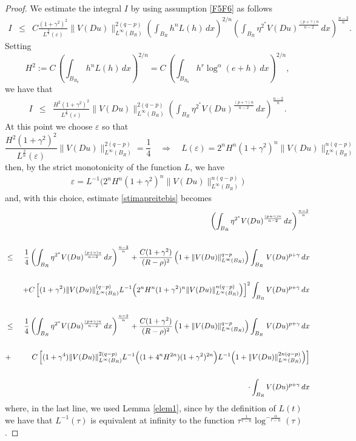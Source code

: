 \documentclass[12pt]{amsart}
\theoremstyle{definition}
\numberwithin{equation}{section}
\numberwithin{equation}{section}
\begin{document}
{\begin{proof}
We estimate the integral $I$ by using assumption \eqref{F5F6} as follows
\begin{eqnarray*}
I &\le& C\frac{(1+\gamma^2)^2}{{L^{\frac{2}{n}}(\varepsilon)}} \|V(Du)\|_{L^\infty\left(B_{{R}}\right)}^{2(q-p)} \left (\int_{B_{{R}}}h^n L(h) \, dx \right )^{2/n} \left (\int_{B_{{R}}}\eta^{2^*}V(Du)^{\frac{(p + \gamma) n}{n-2}} \, dx \right )^{\frac{n-2}{n}}.
\end{eqnarray*}
Setting
\[
H^2 := C \, \left (\int_{B_{R_0}}  h^n L(h) \, dx \right )^{2/n} = C \, \left (\int_{B_{R_0}}  h^r\log^\alpha(e+h) \, dx \right )^{2/n},
\]
 we have that
\begin{eqnarray*}
I &\le& \frac{H^2(1+\gamma^2)^2}{{L^{\frac{2}{n}}(\varepsilon)}} \|V(Du)\|_{L^\infty\left(B_{{R}}\right)} ^{2(q-p)}\left (\int_{B_{R}}\eta^{2^*} V(Du)^{ \frac{(p + \gamma) n}{n-2}} \, dx \right )^{\frac{n-2}{n}}.
\end{eqnarray*}
 At this point we choose $\varepsilon$ so that
\[
\frac{H^2(1+\gamma^2)^2}{{L^{\frac{2}{n}}(\varepsilon)}} \|V(Du)\|_{L^\infty\left(B_{{R}}\right)}^{2(q-p)} = \frac{1}{4}\quad\Longrightarrow  \quad L(\varepsilon)=2^{n}H^n(1+\gamma^2)^n\|V(Du)\|_{L^\infty\left(B_{{R}}\right)}^{n(q-p)}
\]
then, by the strict monotonicity of the function $L$,
 we have 
\begin{eqnarray*}
 \varepsilon = {{L}}^{-1} \Big(2^{n} H^n (1+\gamma^2)^n \|V(Du)\|^{n(q-p)}_{L^\infty\left(B_{{R}}\right)}\Big) 
\end{eqnarray*}
and, with this choice, estimate \eqref{stimapreitebis} becomes
\begin{eqnarray*}
&&\left (\int_{B_{{R}}} \eta^{2^*}V(Du)^{\frac{(p + \gamma) n}{n-2}} \,dx \right )^{\frac{n-2}{n}}\cr\cr
&\le& \frac{1}{4} \left (\int_{B_{{R}}}\eta^{2^*} V(Du)^{\frac{(p + \gamma)n}{n-2}} \, dx \right )^{\frac{n-2}{n}} +\frac{C(1+\gamma^2)}{({R - \rho})^{2}}  \left(1 + \|V(Du)\|_{L^\infty(B_{{R}})}^{q-p} \right)  \int_{B_{R}}  \,  V(Du)^{p + \gamma}  \, dx\cr\cr
&&\,\, +C\left[(1+\gamma^2)\|V(Du)\|_{L^\infty\left(B_{{R}}\right)}^{(q-p)} {{L}}^{-1} \Big(2^{n} H^n (1+\gamma^2)^n \|V(Du)\|^{n(q-p)}_{L^\infty\left(B_{{R}}\right)}\Big) 
\right]^2 
\int_{B_{{R}}} V(Du)^{p + \gamma} \, dx\cr\cr 
&\le& \frac{1}{4} \left (\int_{B_{{R}}}\eta^{2^*} V(Du)^{\frac{(p + \gamma)n}{n-2}} \, dx \right )^{\frac{n-2}{n}} +\frac{C(1+\gamma^2)}{({R - \rho})^{2}}  \left(1 + \|V(Du)\|_{L^\infty(B_{{R}})}^{q-p} \right)  \int_{B_{{R}}}  \,  V(Du)^{p + \gamma}  \, dx\cr\cr
&+&C\left[(1+\gamma^4) \|V(Du)\|_{L^\infty(B_{{R}})}^{2(q-p)} {{L}}^{-1} \Big((1+4^{n} H^{2n}) {(1+\gamma^2)^{2n}}\Big) {{L}}^{-1} \Big(1+\|V(Du)\|^{2n(q-p)}_{L^\infty(B_{{R}})}\Big) 
\right] \cr\cr
&& \qquad\qquad\qquad\cdot\int_{B_{{R}}} V(Du)^{p + \gamma} \, dx 
\end{eqnarray*}
where, in the last line, we used Lemma \ref{elem1}, {since by the definition of $L(t)$ we have that $L^{-1}(\tau)$ is equivalent at infinity to the function $\tau^{\frac{1}{r-n}}\log^{-\frac{\alpha}{r-n}}(\tau)$}.


\end{proof}}
\end{document}
